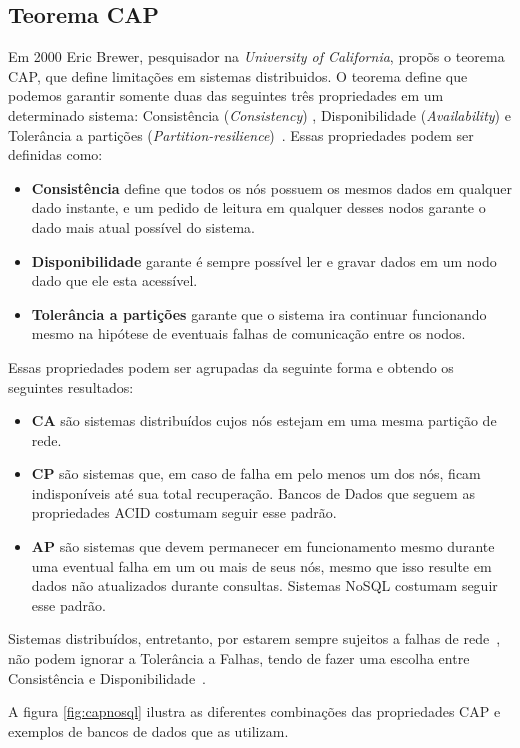 \subsection{Teorema CAP}
\label{sec:cap}
	Em 2000 Eric Brewer, pesquisador na \emph{University of California}, propõs o teorema CAP, que define limitações em sistemas distribuidos. O teorema define que podemos garantir somente duas das seguintes três propriedades em um determinado sistema: Consistência (\emph{Consistency}) , Disponibilidade (\emph{Availability}) e Tolerância a partições (\emph{Partition-resilience})~\cite{brewer}. Essas propriedades podem ser definidas como:
    \begin{itemize}
	\item \textbf{Consistência} define que todos os nós possuem os mesmos dados em qualquer dado instante, e um pedido de leitura em qualquer desses nodos garante o dado mais atual possível do sistema.
    \item \textbf{Disponibilidade} garante é sempre possível ler e gravar dados em um nodo dado que ele esta acessível. 
    \item \textbf{Tolerância a partições} garante que o sistema ira continuar funcionando mesmo na hipótese de eventuais falhas de comunicação entre os nodos.
	\end{itemize}
	
    Essas propriedades podem ser agrupadas da seguinte forma e obtendo os seguintes resultados:
    \begin{itemize}
    \item \textbf{CA} são sistemas distribuídos cujos nós estejam em uma mesma partição de rede.
    \item \textbf{CP} são sistemas que, em caso de falha em pelo menos um dos nós, ficam indisponíveis até sua total recuperação. Bancos de Dados que seguem as propriedades ACID costumam seguir esse padrão.
    \item \textbf{AP} são sistemas que devem permanecer em funcionamento mesmo durante uma eventual falha em um ou mais de seus nós, mesmo que isso resulte em dados não atualizados durante consultas. Sistemas NoSQL costumam seguir esse padrão.  
	\end{itemize}
    
    Sistemas distribuídos, entretanto, por estarem sempre sujeitos a falhas de rede~\cite{deutsch}, não podem ignorar a Tolerância a Falhas, tendo de fazer uma escolha entre Consistência e Disponibilidade~\cite{brewer12years}.
    
    A figura \ref{fig:capnosql} ilustra as diferentes combinações das propriedades CAP e exemplos de bancos de dados que as utilizam.
    

